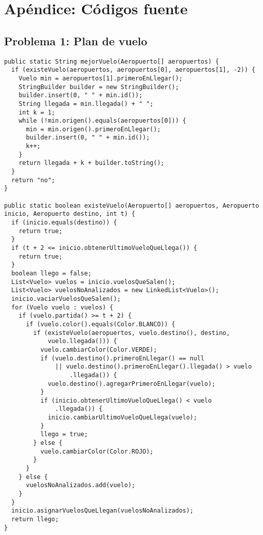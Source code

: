 \section{Apéndice: Códigos fuente}

\subsection{Problema 1: Plan de vuelo }
\begin{lstlisting}[frame=single]
public static String mejorVuelo(Aeropuerto[] aeropuertos) {
  if (existeVuelo(aeropuertos, aeropuertos[0], aeropuertos[1], -2)) {
    Vuelo min = aeropuertos[1].primeroEnLlegar();
    StringBuilder builder = new StringBuilder();
    builder.insert(0, " " + min.id());
    String llegada = min.llegada() + " ";
    int k = 1;
    while (!min.origen().equals(aeropuertos[0])) {
      min = min.origen().primeroEnLlegar();
      builder.insert(0, " " + min.id());
      k++;
    }
    return llegada + k + builder.toString();
  }
  return "no";
}

public static boolean existeVuelo(Aeropuerto[] aeropuertos, Aeropuerto inicio, Aeropuerto destino, int t) {
  if (inicio.equals(destino)) {
    return true;
  }
  if (t + 2 <= inicio.obtenerUltimoVueloQueLlega()) {
    return true;
  }
  boolean llego = false;
  List<Vuelo> vuelos = inicio.vuelosQueSalen();
  List<Vuelo> vuelosNoAnalizados = new LinkedList<Vuelo>();
  inicio.vaciarVuelosQueSalen();
  for (Vuelo vuelo : vuelos) {
    if (vuelo.partida() >= t + 2) {
      if (vuelo.color().equals(Color.BLANCO)) {
        if (existeVuelo(aeropuertos, vuelo.destino(), destino,
            vuelo.llegada())) {
          vuelo.cambiarColor(Color.VERDE);
          if (vuelo.destino().primeroEnLlegar() == null
              || vuelo.destino().primeroEnLlegar().llegada() > vuelo
                  .llegada()) {
            vuelo.destino().agregarPrimeroEnLlegar(vuelo);
          }
          if (inicio.obtenerUltimoVueloQueLlega() < vuelo
              .llegada()) {
            inicio.cambiarUltimoVueloQueLlega(vuelo);
          }
          llego = true;
        } else {
          vuelo.cambiarColor(Color.ROJO);
        }
      }
    } else {
      vuelosNoAnalizados.add(vuelo);
    }
  }
  inicio.asignarVuelosQueLlegan(vuelosNoAnalizados);
  return llego;
}
\end{lstlisting}

